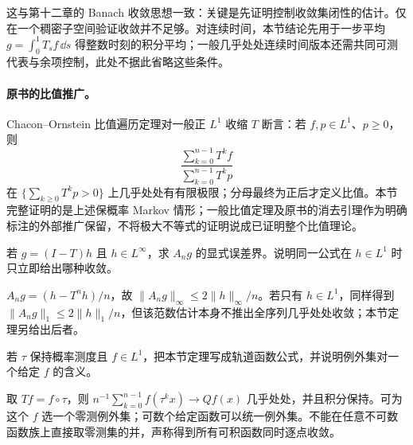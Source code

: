这与第十二章的 Banach 收敛思想一致：关键是先证明控制收敛集闭性的估计。仅在一个稠密子空间验证收敛并不足够。对连续时间，本节结论先用于一步平均 $g=\int_0^1T_sf\,\dd s$ 得整数时刻的积分平均；一般几乎处处连续时间版本还需共同可测代表与余项控制，此处不据此省略这些条件。

\paragraph{原书的比值推广。}
Chacon--Ornstein 比值遍历定理对一般正 $L^1$ 收缩 $T$ 断言：若 $f,p\in L^1$、$p\ge0$，则
\[
 \frac{\sum_{k=0}^{n-1}T^kf}{\sum_{k=0}^{n-1}T^kp}
\]
在 $\{\sum_{k\ge0}T^kp>0\}$ 上几乎处处有有限极限；分母最终为正后才定义比值。本节完整证明的是上述保概率 Markov 情形；一般比值定理及原书的消去引理作为明确标注的外部推广保留，不将极大不等式的证明说成已证明整个比值理论。

\begin{exercise}[上同调差的平均]\label{ex:y13-coboundary}
若 $g=(I-T)h$ 且 $h\in L^\infty$，求 $A_ng$ 的显式误差界。说明同一公式在 $h\in L^1$ 时只立即给出哪种收敛。
\end{exercise}
\begin{solution}
$A_ng=(h-T^nh)/n$，故 $\|A_ng\|_\infty\le2\|h\|_\infty/n$。若只有 $h\in L^1$，同样得到 $\|A_ng\|_1\le2\|h\|_1/n$，但该范数估计本身不推出全序列几乎处处收敛；本节定理另给出后者。
\end{solution}

\begin{exercise}[保持变换的时间平均]\label{ex:y13-birkhoff}
若 $\tau$ 保持概率测度且 $f\in L^1$，把本节定理写成轨道函数公式，并说明例外集对一个给定 $f$ 的含义。
\end{exercise}
\begin{solution}
取 $Tf=f\circ\tau$，则 $n^{-1}\sum_{k=0}^{n-1}f(\tau^kx)\to Qf(x)$ 几乎处处，并且积分保持。可为这个 $f$ 选一个零测例外集；可数个给定函数可以统一例外集。不能在任意不可数函数族上直接取零测集的并，声称得到所有可积函数同时逐点收敛。
\end{solution}

